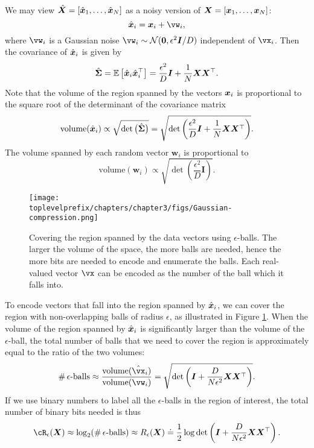 \documentclass[../../book-main.tex]{subfiles}
\begin{document}
We may view $\hat {\bm{X}} = [\hat {\bm{x}}_1,\ldots, \hat {\bm{x}}_N]$ as a noisy version of $\bm{X} = [\bm{x}_1, \ldots, \bm{x}_N]$:
\begin{equation}
	\hat \x_i = \x_i + \vw_i,
\end{equation}
where $\vw_i$ is a Gaussian noise $\vw_i  \sim \mathcal{N}(\boldsymbol{0} , {\epsilon^2}  \boldsymbol{I}/{D})$ independent of $\vx_i$. Then the covariance of $\hat {\bm{x}}_i$ is given by
\begin{equation}
	\hat{\boldsymbol{\Sigma}} = \mathbb{E}\left[\hat {\bm{x}}_i \hat {\bm{x}}_i^\top\right] = \frac{\epsilon^2}{D} \boldsymbol{I} + \frac{1}{N} \bm{X}\bm{X}^\top.
\end{equation}
Note that the volume of the region spanned by the vectors $\bm{x}_i$ is proportional to the square root of the determinant of the
covariance matrix
\begin{equation}
	\mbox{volume}(\hat {\bm{x}}_i) \propto \sqrt{\det \big(\hat{\boldsymbol{\Sigma}}\big)} = \sqrt{\det\left(\frac{\epsilon^2}{D} \boldsymbol{I} + \frac{1}{N} \bm{X}\bm{X}^\top \right)}.
\end{equation}
The volume spanned by each random vector $\boldsymbol{w}_i$ is
proportional to
\begin{equation}
	\mbox{volume}(\boldsymbol{w}_i) \propto   \sqrt{\det\left(\frac{\epsilon^2}{D} \boldsymbol{I} \right)}.
\end{equation}

\begin{figure}
	\centering
	\texttt{[image: \\toplevelprefix/chapters/chapter3/figs/Gaussian-compression.png]}
	\caption{Covering the region spanned by the data vectors using $\epsilon$-balls. The larger the volume of the space, the more balls are needed, hence the more bits are needed to encode and enumerate the balls. Each real-valued vector $\vx$ can be encoded as the number of the ball which it falls into.}
	\label{fig:ball-packing}
\end{figure}

To encode vectors that fall into the region spanned by $\hat {\bm{x}}_i$, we can cover the region with non-overlapping
balls of radius $\epsilon$, as illustrated in Figure \ref{fig:ball-packing}. When the volume of the region spanned by $\hat {\bm{x}}_i$ is significantly larger than the volume of the $\epsilon$-ball, the total number of balls that we need to cover the region is
approximately equal to the ratio of the two volumes:
\begin{equation}
	\# \,\epsilon\mbox{-balls} \approx \frac{\mbox{volume}(\hat \vx_i)}{\mbox{volume}(\vw_i)} = \sqrt{\det\left(\boldsymbol{I} + \frac{D}{N\epsilon^2} \X\X^\top  \right)}.
\end{equation}
If we use binary numbers to label all the $\epsilon$-balls in the region of
interest, the total number of binary bits needed is thus %
\begin{equation} 
	\cR_{\epsilon}(\X) \approx %
	\log_2 (\# \,\epsilon\mbox{-balls}) \approx R_{\epsilon}(\X) \doteq \frac{1}{2} \log \det \left(\boldsymbol{I} + \frac{D}{N\epsilon^2} \X\X^\top \right).
	\label{eqn:rate-Gaussian}
\end{equation}
\end{document}
